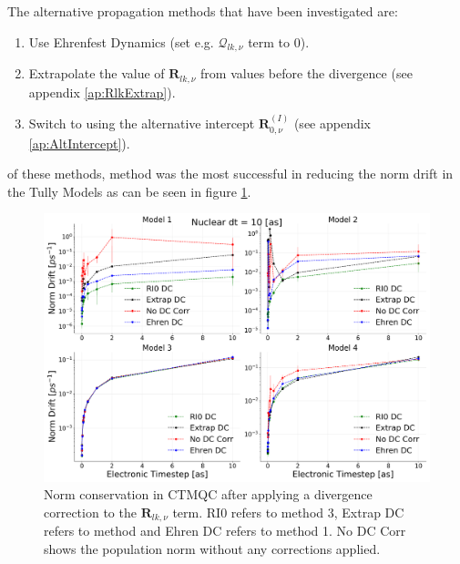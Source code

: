 \noindent The alternative propagation methods that have been investigated are:
\begin{enumerate}
	\item Use Ehrenfest Dynamics (set e.g. $\mathcal{Q}_{lk, \nu}$ term to 0).
	\item Extrapolate the value of $\mathbf{R}_{lk, \nu}$ from values before the divergence (see appendix \ref{ap:RlkExtrap}).
	\item Switch to using the alternative intercept $\mathbf{R}_{0, \nu}^{(I)}$ (see appendix \ref{ap:AltIntercept}).
\end{enumerate}
of these  methods, method  was the most successful in reducing the norm drift in the Tully Models as can be seen in figure \ref{fig:NormConsCorr}.
\begin{figure}[ht]
	\includegraphics[width=\textwidth]{../img/CTMQC/TullyModels/CTMQC_Norm_Conservation_wCorr.png}
	\caption{\label{fig:NormConsCorr}Norm conservation in CTMQC after applying a divergence correction to the $\mathbf{R}_{lk, \nu}$ term. RI0 refers to method 3, Extrap DC refers to method  and Ehren DC refers to method 1. No DC Corr shows the population norm without any corrections applied.}
\end{figure}
\\
